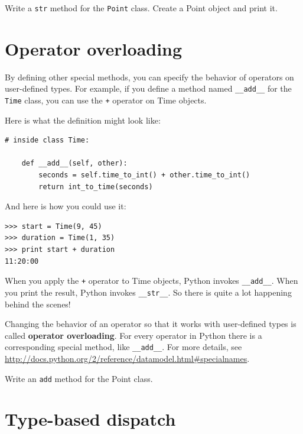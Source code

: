 \documentclass[10pt]{book}
\begin{document}
\begin{exercise}

Write a {\tt str} method for the {\tt Point} class.  Create
a Point object and print it.

\end{exercise}


\section{Operator overloading}
\label{operator.overloading}

By defining other special methods, you can specify the behavior
of operators on user-defined types.  For example, if you define
a method named \verb"__add__" for the {\tt Time} class, you can use the
{\tt +} operator on Time objects.

Here is what the definition might look like:

\begin{verbatim}
# inside class Time:

    def __add__(self, other):
        seconds = self.time_to_int() + other.time_to_int()
        return int_to_time(seconds)
\end{verbatim}
%
And here is how you could use it:

\begin{verbatim}
>>> start = Time(9, 45)
>>> duration = Time(1, 35)
>>> print start + duration
11:20:00
\end{verbatim}
%
When you apply the {\tt +} operator to Time objects, Python invokes
\verb"__add__".  When you print the result, Python invokes
\verb"__str__".  So there is quite a lot happening behind the scenes!

Changing the behavior of an operator so that it works with
user-defined types is called {\bf operator overloading}.  For every
operator in Python there is a corresponding special method, like
\verb"__add__".  For more details, see
\url{http://docs.python.org/2/reference/datamodel.html#specialnames}.

\begin{exercise}

Write an {\tt add} method for the Point class.

\end{exercise}


\section{Type-based dispatch}
\end{document}
